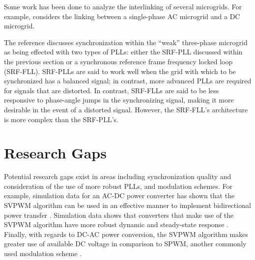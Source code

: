 Some work has been done to analyze the interlinking of several microgrids. For example, \cite{Blaabjerg_Interlinking} considers the linking between a single-phase AC microgrid and a DC microgrid. 

The reference \cite{Blaabjerg_Microgrids_Control} discusses synchronization within the “weak” three-phase microgrid as being effected with two types of PLLs: either the SRF-PLL discussed within the previous section or a synchronous reference frame frequency locked loop (SRF-FLL). SRF-PLLs are said to work well when the grid with which to be synchronized has a balanced signal; in contrast, more advanced PLLs are required for signals that are distorted. In contrast, SRF-FLLs are said to be less responsive to phase-angle jumps in the synchronizing signal, making it more desirable in the event of a distorted signal. However, the SRF-FLL’s architecture is more complex than the SRF-PLL’s. 

\section{Research Gaps}

Potential research gaps exist in areas including synchronization quality and consideration of the use of more robust PLLs, and modulation schemes. For example, simulation data for an AC-DC power converter has shown that the SVPWM algorithm can be used in an effective manner to implement bidirectional power transfer \cite{Deng}. Simulation data shows that converters that make use of the SVPWM algorithm have more robust dynamic and steady-state response \cite{Wang}. Finally, with regards to DC-AC power conversion, the SVPWM algorithm makes greater use of available DC voltage in comparison to SPWM, another commonly used modulation scheme \cite{Zhang}.